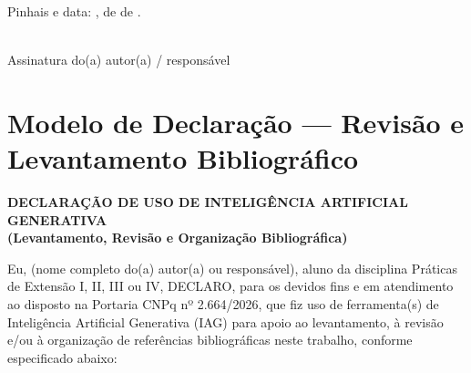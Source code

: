 \bigskip
\noindent
Pinhais e data: \underline{\hspace{4cm}}, \underline{\hspace{1.5cm}} de
\underline{\hspace{3cm}} de \underline{\hspace{1.5cm}}.

\bigskip\bigskip
\noindent
\underline{\hspace{7cm}}\\
Assinatura do(a) autor(a) / responsável


\newpage
\section{Modelo de Declaração --- Revisão e Levantamento Bibliográfico}
\label{ap:declaracao_revisao_bibliografia}

\begin{center}
\textbf{\large DECLARAÇÃO DE USO DE INTELIGÊNCIA ARTIFICIAL GENERATIVA}\\
\textbf{(Levantamento, Revisão e Organização Bibliográfica)}
\end{center}

\bigskip
\noindent
Eu, \underline{\hspace{7cm}} (nome completo do(a) autor(a) ou responsável),
aluno da disciplina Práticas de Extensão I, II, III ou IV, DECLARO, para os devidos
fins e em atendimento ao disposto na Portaria CNPq nº 2.664/2026, que fiz uso de
ferramenta(s) de Inteligência Artificial Generativa (IAG) para apoio ao levantamento,
à revisão e/ou à organização de referências bibliográficas neste trabalho, conforme
especificado abaixo:

